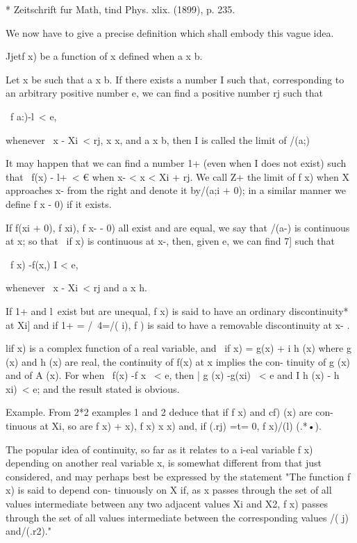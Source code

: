 * Zeitschrift fur Math, tind Phys. xlix. (1899), p. 235.

%
%

We now have to give a precise definition which shall embody this vague
idea.

Jjetf x) be a function of x defined when a x b.

Let x be such that a x b. If there exists a number I such that,
corresponding to an arbitrary positive number e, we can find a
positive number rj such that

\ f a:)-l\ < e,

whenever \ x - Xi\ < rj, x x, and a x b, then I is called the limit
of /(a;)

It may happen that we can find a number 1+ (even when I does not
exist) such that \ f(x) - l+\ < € when x- < x < Xi + rj. We call Z+
the limit of f x) when X approaches x- from the right and denote it
by/(a;i + 0); in a similar manner we define f x - 0) if it exists.

If f(xi + 0), f xi), f x- - 0) all exist and are equal, we say that
/(a-) is continuous at x; so that \ if x) is continuous at x-, then,
given e, we can find 7] such that

\ f x) -f(x,) I < e,

whenever \ x - Xi\ < rj and a x h.

If 1+ and l\ exist but are unequal, f x) is said to have an ordinary
discontinuity* at Xi] and if 1+ = /\ 4=/( i), f ) is said to have a
removable discontinuity at x- .

lif x) is a complex function of a real variable, and \ if x) = g(x) +
i h (x) where g (x) and h (x) are real, the continuity of f(x) at x
implies the con- tinuity of g (x) and of A (x). For when \ f(x) -f x \
< e, then | g (x) -g(xi) \ < e and I h (x) - h xi)\ < e; and the
result stated is obvious.

Example. From 2*2 examples 1 and 2 deduce that if f x) and cf) (x) are
con- tinuous at Xi, so are f x) + x), f x) x x) and, if (.rj) =t= 0,
f x)/(l) (.*•).

The popular idea of continuity, so far as it relates to a i-eal
variable f x) depending on another real variable x, is somewhat
different from that just considered, and may perhaps best be expressed
by the statement "The function f x) is said to depend con- tinuously
on X if, as x passes through the set of all values intermediate
between any two adjacent values Xi and X2, f x) passes through the set
of all values intermediate between the corresponding values /( j)
and/(.r2)."

